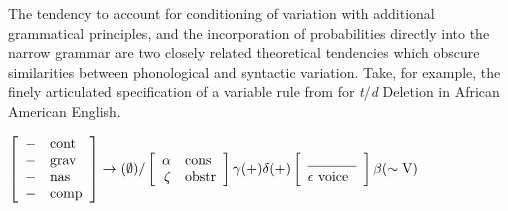 The tendency to account for conditioning of variation with additional grammatical principles, and the incorporation of probabilities directly into the narrow grammar are two closely related theoretical tendencies which obscure similarities between phonological and syntactic variation.
Take, for example, the finely articulated specification of a variable rule from \citet{3288} for {\sl t}/{\sl d} Deletion in African American English.
\begin{exe}
 \ex $\left[\begin{array}{rl}
	-&\mbox{cont}\\
	-&\mbox{grav}\\
	-&\mbox{nas}\\
	-&\mbox{comp}
\end{array}\right] \rightarrow (\emptyset) / 
\left[
	\begin{array}{rl}
		\alpha & \mbox{cons}\\
		\zeta &  \mbox{obstr}
	\end{array}
\right]\gamma(\mbox{+})\delta(\mbox{+})
\left[
	\begin{array}{l}
	\underline{\hskip 35pt}\\
	\epsilon~\mbox{voice}
	\end{array}
\right]
\beta(\sim \mbox{V})$ \label{variable.rule}
\end{exe}

